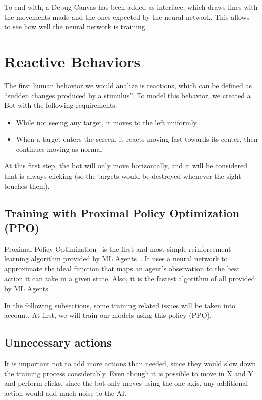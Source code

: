 To end with, a Debug Canvas has been added as interface, which draws lines with the movements made and the ones expected by the neural network. This allows to see how well the neural network is training.

\section{Reactive Behaviors}

The first human behavior we would analize is reactions, which can be defined as ``sudden changes produced by a stimulus''. To model this behavior, we created a Bot with the following requirements:

\begin{itemize}
 \item While not seeing any target, it moves to the left uniformly
 \item When a target enters the screen, it reacts moving fast towards its center, then continues moving as normal
\end{itemize}

At this first step, the bot will only move horizontally, and it will be considered that is always clicking (so the targets would be destroyed whenever the sight touches them).

\subsection{Training with Proximal Policy Optimization (PPO)}
\label{sec:trainingPPO}

Proximal Policy Optimization~\cite{ppopolicy} is the first and most simple reinforcement learning algorithm  provided by ML Agents~\cite{mlagents}. It uses a neural network to approximate the ideal function that maps an agent's observation to the best action it can take in a given state. Also, it is the fastest algorithm of all provided by ML Agents.

In the following subsections, some training related issues will be taken into account. At first, we will train our models using this policy (PPO).

\subsection{Unnecessary actions}
It is important not to add more actions than needed, since they would slow down the training process considerably. Even though it is possible to move in X and Y and perform clicks, since the bot only moves using the one axis, any additional action would add much noise to the AI. 

